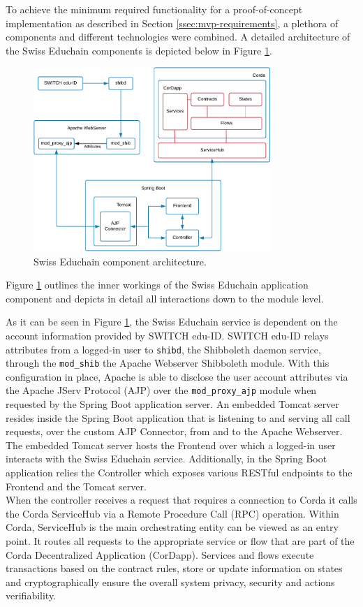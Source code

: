 To achieve the minimum required functionality for a proof-of-concept implementation as described in Section \ref{ssec:mvp-requirements}, a plethora of components and different technologies were combined. A detailed architecture of the Swiss Educhain components is depicted below in Figure \ref{fig:arch-educhain}.

\begin{figure}[H]
	\centering
	\includegraphics[width=0.8\textwidth]{figs/ch4/arch-educhain}
	\caption{Swiss Educhain component architecture.}
	\label{fig:arch-educhain}
\end{figure}

Figure \ref{fig:arch-educhain} outlines the inner workings of the Swiss Educhain application component and depicts in detail all interactions down to the module level. 

As it can be seen in Figure \ref{fig:arch-educhain}, the Swiss Educhain service is dependent on the account information provided by SWITCH edu-ID. SWITCH edu-ID relays attributes from a logged-in user to \texttt{shibd}, the Shibboleth daemon service, through the \texttt{mod\_shib} the Apache Webserver Shibboleth module. With this configuration in place, Apache is able to disclose the user account attributes via the Apache JServ Protocol (AJP) over the \texttt{mod\_proxy\_ajp} module when requested by the Spring Boot application server. An embedded Tomcat server resides inside the Spring Boot application that is listening to and serving all call requests, over the custom AJP Connector, from and to the Apache Webserver. The embedded Tomcat server hosts the Frontend over which a logged-in user interacts with the Swiss Educhain service. Additionally, in the Spring Boot application relies the Controller which exposes various RESTful endpoints to the Frontend and the Tomcat server. \\
When the controller receives a request that requires a connection to Corda it calls the Corda ServiceHub via a Remote Procedure Call (RPC) operation. Within Corda, ServiceHub is the main orchestrating entity can be viewed as an entry point. It routes all requests to the appropriate service or flow that are part of the Corda Decentralized Application (CorDapp). Services and flows execute transactions based on the contract rules, store or update information on states and cryptographically ensure the overall system privacy, security and actions verifiability.

